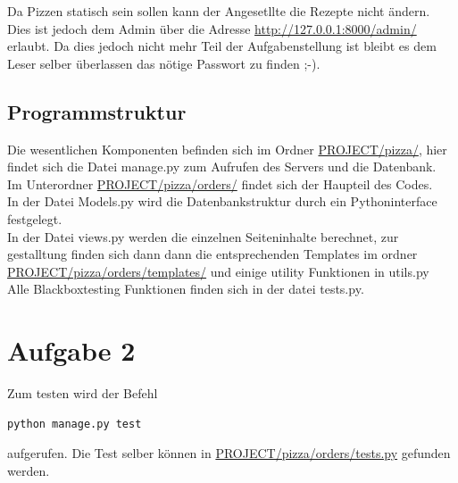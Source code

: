 \documentclass[a4paper]{report}
\begin{document}
Da Pizzen statisch sein sollen kann der Angesetllte die Rezepte nicht ändern. Dies ist jedoch dem Admin über die Adresse \url{http://127.0.0.1:8000/admin/} erlaubt. Da dies jedoch nicht mehr Teil der Aufgabenstellung ist bleibt es dem Leser selber überlassen das nötige Passwort zu finden ;-).


\subsection*{Programmstruktur}
Die wesentlichen Komponenten befinden sich im Ordner \url{PROJECT/pizza/}, hier findet sich die Datei manage.py zum Aufrufen des Servers und die Datenbank.\\
Im Unterordner  \url{PROJECT/pizza/orders/} findet sich der Haupteil des Codes.\\
In der Datei Models.py wird die Datenbankstruktur durch ein Pythoninterface festgelegt.\\
In der Datei views.py werden die einzelnen Seiteninhalte berechnet, zur gestalltung finden sich dann dann die entsprechenden Templates im ordner  \url{PROJECT/pizza/orders/templates/} und einige utility Funktionen in utils.py\\
Alle Blackboxtesting Funktionen finden sich in der datei tests.py.

\newpage
\section*{Aufgabe 2}
Zum testen wird der Befehl
\begin{lstlisting}
python manage.py test
\end{lstlisting}
aufgerufen. Die Test selber können in \url{PROJECT/pizza/orders/tests.py} gefunden werden.
\end{document}
